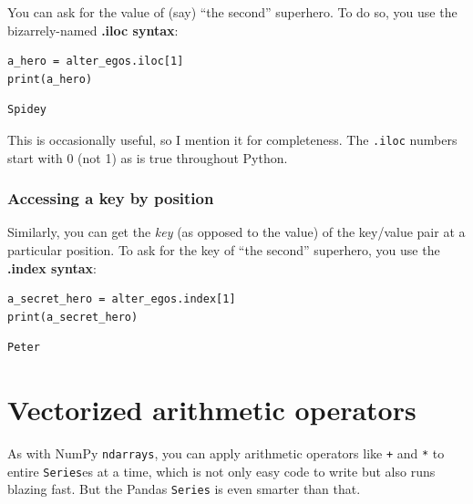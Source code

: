 \label{iloc}

You can ask for the value of (say) ``the second'' superhero. To do so, you use
the bizarrely-named \textbf{.iloc syntax}:

\begin{Verbatim}[fontsize=\small,samepage=true,frame=single,framesep=3mm]
a_hero = alter_egos.iloc[1]
print(a_hero)
\end{Verbatim}
\vspace{-.3in}

\begin{Verbatim}[fontsize=\small,samepage=true,frame=leftline,framesep=5mm,framerule=1mm]
Spidey
\end{Verbatim}

This is occasionally useful, so I mention it for completeness. The
\texttt{.iloc} numbers start with 0 (not 1) as is true throughout Python.

\subsubsection{Accessing a key by position}

\label{dotIndex}

Similarly, you can get the \textit{key} (as opposed to the value) of the
key/value pair at a particular position. To ask for the key of ``the second''
superhero, you use the \textbf{.index syntax}:

\begin{Verbatim}[fontsize=\small,samepage=true,frame=single,framesep=3mm]
a_secret_hero = alter_egos.index[1]
print(a_secret_hero)
\end{Verbatim}
\vspace{-.3in}

\begin{Verbatim}[fontsize=\small,samepage=true,frame=leftline,framesep=5mm,framerule=1mm]
Peter
\end{Verbatim}


\section{Vectorized arithmetic operators}

As with NumPy \texttt{ndarrays}, you can apply arithmetic operators like
\texttt{+} and \texttt{*} to entire \texttt{Series}es at a time, which is not
only easy code to write but also runs blazing fast. But the Pandas
\texttt{Series} is even smarter than that.

